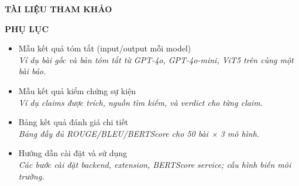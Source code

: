 \documentclass[a4paper,12pt]{article}
\begin{document}
{\fontsize{13pt}{15pt}\selectfont\bfseries TÀI LIỆU THAM KHẢO}

\vspace{0.3cm}

{\fontsize{13pt}{15pt}\selectfont\bfseries PHỤ LỤC}
\begin{itemize}[leftmargin=1cm, labelsep=0.3cm, itemsep=3pt, label={--}]
  \item Mẫu kết quả tóm tắt (input/output mỗi model) \\
    {\small\itshape Ví dụ bài gốc và bản tóm tắt từ GPT-4o, GPT-4o-mini, ViT5 trên cùng một bài báo.}
  \item Mẫu kết quả kiểm chứng sự kiện \\
    {\small\itshape Ví dụ claims được trích, nguồn tìm kiếm, và verdict cho từng claim.}
  \item Bảng kết quả đánh giá chi tiết \\
    {\small\itshape Bảng đầy đủ ROUGE/BLEU/BERTScore cho 50 bài × 3 mô hình.}
  \item Hướng dẫn cài đặt và sử dụng \\
    {\small\itshape Các bước cài đặt backend, extension, BERTScore service; cấu hình biến môi trường.}
\end{itemize}
\end{document}
